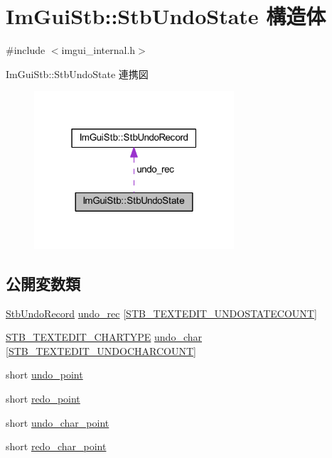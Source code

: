 \hypertarget{struct_im_gui_stb_1_1_stb_undo_state}{}\section{Im\+Gui\+Stb\+:\+:Stb\+Undo\+State 構造体}
\label{struct_im_gui_stb_1_1_stb_undo_state}


{\ttfamily \#include $<$imgui\+\_\+internal.\+h$>$}



Im\+Gui\+Stb\+:\+:Stb\+Undo\+State 連携図\nopagebreak
\begin{figure}[H]
\begin{center}
\leavevmode
\includegraphics[width=211pt]{struct_im_gui_stb_1_1_stb_undo_state__coll__graph}
\end{center}
\end{figure}
\subsection*{公開変数類}
\begin{DoxyCompactItemize}
\item 
\mbox{\hyperlink{struct_im_gui_stb_1_1_stb_undo_record}{Stb\+Undo\+Record}} \mbox{\hyperlink{struct_im_gui_stb_1_1_stb_undo_state_a3cba4c0766038584aa310a52e763bbda}{undo\+\_\+rec}} \mbox{[}\mbox{\hyperlink{stb__textedit_8h_afa79483143df87a1497010712b3dfaf9}{S\+T\+B\+\_\+\+T\+E\+X\+T\+E\+D\+I\+T\+\_\+\+U\+N\+D\+O\+S\+T\+A\+T\+E\+C\+O\+U\+NT}}\mbox{]}
\item 
\mbox{\hyperlink{stb__textedit_8h_a6e64031a061922e3a48d88fd8623f4c3}{S\+T\+B\+\_\+\+T\+E\+X\+T\+E\+D\+I\+T\+\_\+\+C\+H\+A\+R\+T\+Y\+PE}} \mbox{\hyperlink{struct_im_gui_stb_1_1_stb_undo_state_ad0f20ff04903ecdf613b8ad083937bbd}{undo\+\_\+char}} \mbox{[}\mbox{\hyperlink{stb__textedit_8h_a15cbcac55cf92003c28c44734422756a}{S\+T\+B\+\_\+\+T\+E\+X\+T\+E\+D\+I\+T\+\_\+\+U\+N\+D\+O\+C\+H\+A\+R\+C\+O\+U\+NT}}\mbox{]}
\item 
short \mbox{\hyperlink{struct_im_gui_stb_1_1_stb_undo_state_a594ee4720e8280db9595f2d5419a279c}{undo\+\_\+point}}
\item 
short \mbox{\hyperlink{struct_im_gui_stb_1_1_stb_undo_state_a6562a15b41f003f411253fe34ca81612}{redo\+\_\+point}}
\item 
short \mbox{\hyperlink{struct_im_gui_stb_1_1_stb_undo_state_aab20994d092277b9d590d24ff7667bae}{undo\+\_\+char\+\_\+point}}
\item 
short \mbox{\hyperlink{struct_im_gui_stb_1_1_stb_undo_state_a78a5419b9c8278da078ed7acd2daac23}{redo\+\_\+char\+\_\+point}}
\end{DoxyCompactItemize}


